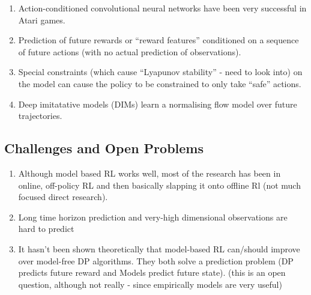 \documentclass{article}
\begin{document}
\begin{enumerate}
  \item Action-conditioned convolutional neural networks have been very successful in Atari games.
  \item Prediction of future rewards or ``reward features'' conditioned on a sequence of future actions (with no actual prediction of observations).
  \item Special constraints (which cause ``Lyapunov stability'' - need to look into) on the model can cause the policy to be constrained to only take ``safe'' actions.
  \item Deep imitatative models (DIMs) learn a normalising flow model over future trajectories.
\end{enumerate}

\subsection{Challenges and Open Problems}

\begin{enumerate}
  \item Although model based RL works well, most of the research has been in online, off-policy RL and then basically slapping it onto offline Rl (not much focused direct research).
  \item Long time horizon prediction and very-high dimensional observations are hard to predict
    \item It hasn't been shown theoretically that model-based RL can/should improve over model-free DP algorithms. They both solve a prediction problem (DP predicts future reward and Models predict future state). (this is an open question, although not really  - since empirically models are very useful)
    \end{enumerate}
\end{document}
